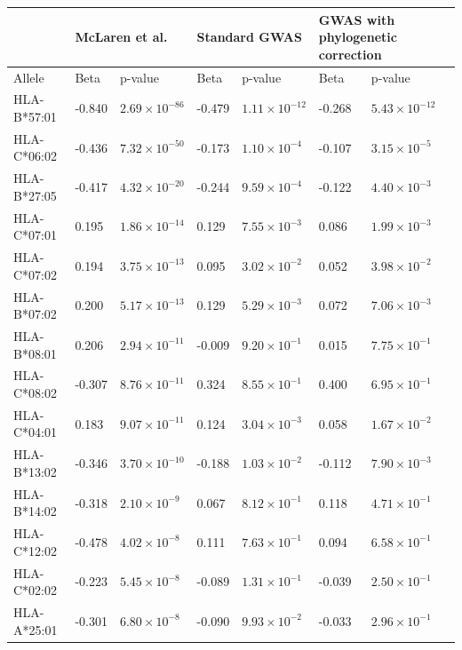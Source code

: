\documentclass[]{article}
\begin{document}
\begin{doublespace}
\newpage
\begin{longtable}[H]{p{3cm}p{1cm}p{2cm}p{1cm}p{2cm}p{1cm}p{2cm}} %
		\hline
		& \multicolumn{2}{l}{McLaren et al.}  & \multicolumn{2}{l}{Standard GWAS} & \multicolumn{2}{l}{GWAS with phylogenetic correction} \\ 
		\hline
	 	Allele & Beta & p-value & Beta &p-value & Beta& p-value \\ 
		\hline
		HLA-B*57:01 & -0.840 & $2.69 \times 10^{-86}$ & -0.479 & $1.11 \times 10^{-12}$ & -0.268 & $5.43 \times 10^{-12}$ \\ 
		HLA-C*06:02 & -0.436 & $7.32 \times 10^{-50}$ & -0.173 & $1.10 \times 10^{-4}$ & -0.107 & $3.15 \times 10^{-5}$ \\ 
		HLA-B*27:05 & -0.417 & $4.32 \times 10^{-20}$ & -0.244 & $9.59 \times 10^{-4}$ & -0.122 & $4.40 \times 10^{-3}$ \\ 
		HLA-C*07:01 & 0.195 & $1.86 \times 10^{-14}$ & 0.129 & $7.55 \times 10^{-3}$ & 0.086 & $1.99 \times 10^{-3}$ \\ 
		HLA-C*07:02 & 0.194 & $3.75 \times 10^{-13}$ & 0.095 & $3.02 \times 10^{-2}$ & 0.052 & $3.98 \times 10^{-2}$ \\ 
		HLA-B*07:02 & 0.200 & $5.17 \times 10^{-13}$ & 0.129 & $5.29 \times 10^{-3}$ & 0.072 & $7.06 \times 10^{-3}$ \\ 
		HLA-B*08:01 & 0.206 & $2.94 \times 10^{-11}$ & -0.009 & $9.20 \times 10^{-1}$ & 0.015 & $7.75 \times 10^{-1}$ \\ 
		HLA-C*08:02 & -0.307 & $8.76 \times 10^{-11}$ & 0.324 & $8.55 \times 10^{-1}$ & 0.400 & $6.95 \times 10^{-1}$ \\ 
		HLA-C*04:01 & 0.183 & $9.07 \times 10^{-11}$ & 0.124 & $3.04 \times 10^{-3}$ & 0.058 & $1.67 \times 10^{-2}$ \\ 
		HLA-B*13:02 & -0.346 & $3.70 \times 10^{-10}$ & -0.188 & $1.03 \times 10^{-2}$ & -0.112 & $7.90 \times 10^{-3}$ \\ 
		HLA-B*14:02 & -0.318 & $2.10 \times 10^{-9}$ & 0.067 & $8.12 \times 10^{-1}$ & 0.118 & $4.71 \times 10^{-1}$ \\ 
		HLA-C*12:02 & -0.478 & $4.02 \times 10^{-8}$ & 0.111 & $7.63 \times 10^{-1}$ & 0.094 & $6.58 \times 10^{-1}$ \\ 
		HLA-C*02:02 & -0.223 & $5.45 \times 10^{-8}$ & -0.089 & $1.31 \times 10^{-1}$ & -0.039 & $2.50 \times 10^{-1}$ \\ 
		HLA-A*25:01 & -0.301 & $6.80 \times 10^{-8}$ & -0.090 & $9.93 \times 10^{-2}$ & -0.033 & $2.96 \times 10^{-1}$ \\ 

\end{longtable}
\end{doublespace}
\end{document}
